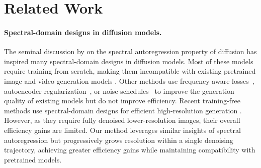 \section{Related Work}

\label{sec:related}



\vspace{-4pt}
\paragraph{Spectral-domain designs in diffusion models.} The seminal discussion by \citet{dieleman2024spectral} on the spectral autoregression property of diffusion has inspired many spectral-domain designs in diffusion models. Most of these models \cite{wavediff, wavescore, dimsum, wfvae, wavedm, du2025flowk, dctdiff} require training from scratch, making them incompatible with existing pretrained image and video generation models \cite{flux-2,zimage,wan,cogvideox}. Other methods use frequency-aware losses~\cite{lwd, spectral-reg}, autoencoder regularization~\cite{diffusability}, or noise schedules~\cite{beta-sampling, spectralschedule, spectrallyguided, fourierspace} to improve the generation quality of existing models but do not improve efficiency. Recent training-free methods use spectral-domain designs for efficient high-resolution generation \cite{frecas, diffusehigh, hiwave}. However, as they require fully denoised lower-resolution images, their overall efficiency gains are limited. Our method leverages similar insights of spectral autoregression but progressively grows resolution within a single denoising trajectory, achieving greater efficiency gains while maintaining compatibility with pretrained models. 




